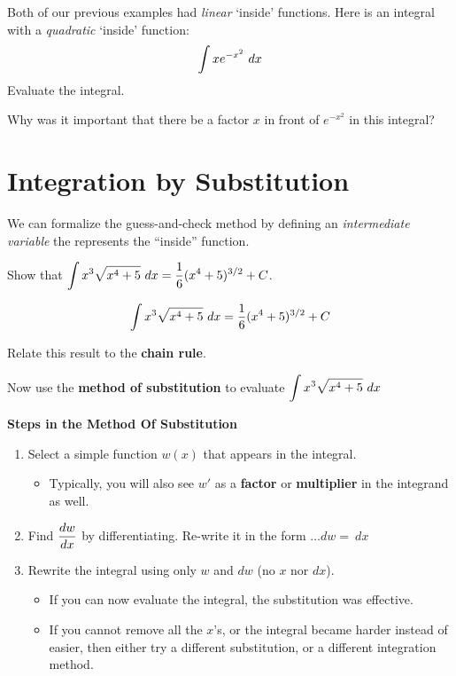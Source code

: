Both of our previous examples had {\em linear} `inside'
  functions.  Here is an integral with a {\em quadratic} `inside' function:
$$\displaystyle{\int x e^{-x^2} ~dx}$$
\problem Evaluate the integral.  \vfill \vfill

Why was it important that there be a factor $x$ in front
  of $e^{-x^2}$ in this integral?

\vfill

\newpage
{}
\section*{Integration by Substitution}

We can formalize the guess-and-check method by defining an {\em
  intermediate variable} the represents the ``inside'' function.

\problem Show that $\displaystyle \int x^3 \sqrt{x^4 + 5} ~dx = {1 \over 6} (x^4
  + 5)^{3/2} + C$.

\vfill
\vfill

\newpage
$$\displaystyle \int x^3 \sqrt{x^4 + 5} ~dx = {1 \over 6} (x^4
  + 5)^{3/2} + C$$

\problem Relate this result to the {\bf chain rule}.

\vfill

\vsc

\newpage

\problem Now use the {\bf method of substitution} to evaluate $\displaystyle
  \int x^3 \sqrt{x^4 + 5}~dx$

\vfill
\vfill
\vfill
\vfill


\newpage


{\bf Steps in the Method Of Substitution}

\begin{enumerate}[1.]
\item Select a simple function $w(x)$ that appears in the integral.
  \begin{itemize}
  \item Typically, you will also see $w'$ as a {\bf factor} or {\bf
      multiplier} in the integrand as well.
  \end{itemize}
\item Find $\displaystyle \frac{dw}{dx}$ by differentiating.  Re-write it in the
  form $\ldots dw = ~dx$
  \item Rewrite the integral using only $w$ and $dw$ (no $x$ nor
    $dx$).
  \begin{itemize}
  \item If you can now evaluate the integral, the substitution
was effective. 
\item If you cannot remove all the $x$'s, or the integral became
  harder instead of easier, then either try a different substitution,
  or a different integration method.
  \end{itemize}
\end{enumerate}

